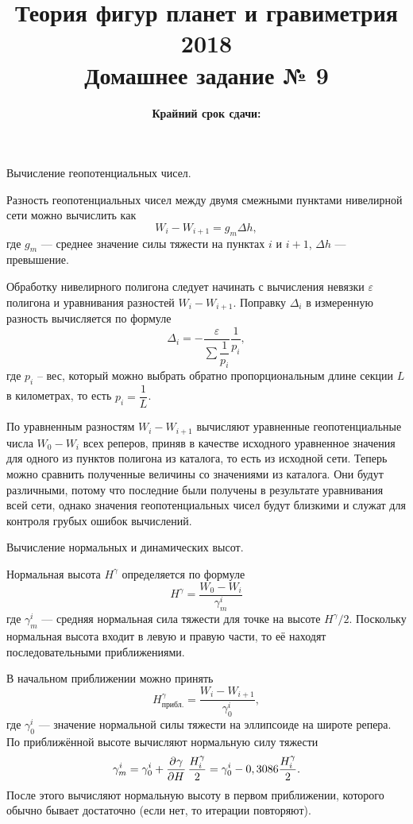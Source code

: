 \documentclass[11pt, a4paper,addpoints]{exam}
\title{{\Large Теория фигур планет и гравиметрия 2018}\\ 
    {\bf\Large Домашнее задание № 9}}
\author{}
\date{\normalsize\bf Крайний срок сдачи: \DTMusedate{deadline}}
\theoremstyle{remark}
\renewcommand{\epsilon}{\ensuremath{\varepsilon}}
\begin{document}
\maketitle
\begin{questions}
    \question Вычисление геопотенциальных чисел.

    Разность геопотенциальных чисел между двумя смежными пунктами нивелирной сети можно вычислить как
    \begin{equation*}
        W_i - W_{i + 1} = g_m \Delta h,
    \end{equation*}
    где $g_m$ --- среднее значение силы тяжести на пунктах $i$ и ${i+1}$, $\Delta h$ --- превышение.

    Обработку нивелирного полигона следует начинать с вычисления невязки $\epsilon$ полигона и
    уравнивания разностей $W_i - W_{i+1}$. Поправку $\Delta_i$ в измеренную разность вычисляется по
    формуле
    \begin{equation*}
        \Delta_i = -\dfrac{\epsilon}{\sum\dfrac{1}{p_i}} \dfrac{1}{p_i},
    \end{equation*}
    где $p_i$ -- вес, который можно выбрать обратно пропорциональным длине секции $L$ в километрах, то есть
    $p_i = \dfrac{1}{L}$.

    По уравненным разностям $W_i - W_{i+1}$ вычисляют уравненные геопотенциальные числа $W_0 - W_i$ 
    всех реперов, приняв в качестве исходного уравненное значения для одного из пунктов полигона из
    каталога, то есть из исходной сети. Теперь можно сравнить полученные величины со значениями из
    каталога. Они будут различными, потому что последние были получены в результате уравнивания всей
    сети, однако значения геопотенциальных чисел будут близкими и служат для контроля грубых ошибок
    вычислений.

    \question Вычисление нормальных и динамических высот.

    Нормальная высота $H^\gamma$ определяется по формуле
    \begin{equation*}
        H^\gamma = \dfrac{W_0 - W_i}{\gamma_m^i}
    \end{equation*}
    где $\gamma_m^i$ --- средняя нормальная сила тяжести для точке на высоте $H^\gamma / 2$. Поскольку
    нормальная высота входит в левую и правую части, то её находят последовательными приближениями. 

    В начальном приближении можно принять
    \begin{equation*}
        H^\gamma_{\textrm{прибл.}} = \dfrac{W_i - W_{i+1}}{\gamma_0^i},
    \end{equation*}
    где $\gamma_0^i$ --- значение нормальной силы тяжести на эллипсоиде на широте репера. По приближённой высоте
    вычисляют нормальную силу тяжести
    \begin{equation*}
        \gamma_m^i = \gamma_0^i + \dpd{\gamma}{H} \dfrac{H_i^\gamma}{2} =
        \gamma_0^i - 0,3086 \dfrac{H_i^\gamma}{2}.
    \end{equation*}
    После этого вычисляют нормальную высоту в первом приближении, которого обычно бывает достаточно
    (если нет, то итерации повторяют).


\end{questions}
\end{document}
